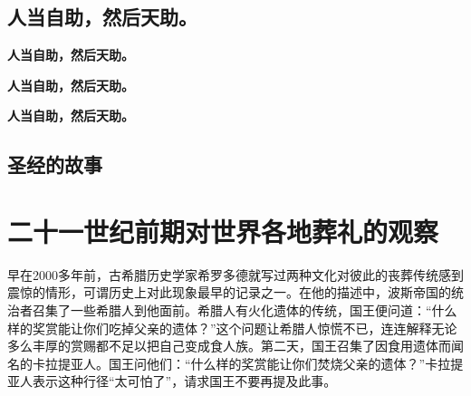 \documentclass[12pt,oneside]{book}
\begin{document}
\section{人当自助，然后天助。}
\textbf{人当自助，然后天助。}

\textbf{人当自助，然后天助。}

\textbf{人当自助，然后天助。}

\section{圣经的故事}

\chapter{二十一世纪前期对世界各地葬礼的观察}

\begin{bookref}[frametitle={\cite{好好告别}}]
早在2000多年前，古希腊历史学家希罗多德就写过两种文化对彼此的丧葬传统感到震惊的情形，可谓历史上对此现象最早的记录之一。在他的描述中，波斯帝国的统治者召集了一些希腊人到他面前。希腊人有火化遗体的传统，国王便问道：“什么样的奖赏能让你们吃掉父亲的遗体？”这个问题让希腊人惊慌不已，连连解释无论多么丰厚的赏赐都不足以把自己变成食人族。第二天，国王召集了因食用遗体而闻名的卡拉提亚人。国王问他们：“什么样的奖赏能让你们焚烧父亲的遗体？”卡拉提亚人表示这种行径“太可怕了”，请求国王不要再提及此事。

\end{bookref}
\end{document}

